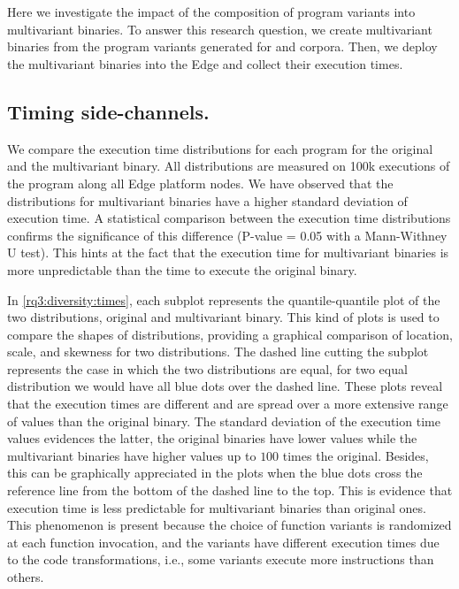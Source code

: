 \section{\rqthree}
\label{results:rq3}

Here we investigate the impact of the composition of program variants into multivariant binaries.
To answer this research question, we create multivariant binaries from the program variants generated for \corpussodium and \corpusqrcode corpora. Then, we deploy the multivariant binaries into the Edge and collect their execution times. 

\subsection*{Timing side-channels.}


We compare the execution time distributions for each program for the original and the multivariant binary. All distributions are measured on 100k executions of the program along all Edge platform nodes.
We have observed that the distributions for multivariant binaries have a higher standard deviation of execution time.
A statistical comparison between the execution time distributions confirms the significance of this difference (P-value = 0.05 with a  Mann-Withney U test). This hints at the fact that the execution time for multivariant binaries is more unpredictable than the time to execute the original binary. 


In \autoref{rq3:diversity:times}, each subplot represents the quantile-quantile plot \cite{gnanadesikan1968probability} of the two distributions, original and multivariant binary.
This kind of plots is used to compare the shapes of distributions, providing a graphical comparison of location, scale, and skewness for two distributions.
The dashed line cutting the subplot represents the case in which the two distributions are equal, \ie for two equal distribution we would have all blue dots over the dashed line. These plots reveal that the execution times are different and are spread over a more extensive range of values than the original binary.
The standard deviation of the execution time values evidences the latter, the original binaries have lower values while the multivariant binaries have higher values up to $100$ times the original. Besides, this can be graphically appreciated in the plots when the blue dots cross the reference line from the bottom of the dashed line to the top.
This is evidence that execution time is less predictable for multivariant binaries than original ones.
This phenomenon is present because the choice of function variants is randomized at each function invocation, and the variants have different execution times due to the code transformations, i.e., some variants execute more instructions than others. 
 


